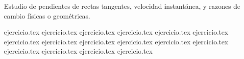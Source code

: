 
Estudio de pendientes de rectas tangentes, velocidad instantánea, y razones de cambio físicas o geométricas.

\begin{enumerate}
    {ejercicio.tex}
    {ejercicio.tex}
    \setcounter{enumi}{2}
    {ejercicio.tex}
    {ejercicio.tex}
    {ejercicio.tex}
    {ejercicio.tex}
    {ejercicio.tex}
    {ejercicio.tex}
    {ejercicio.tex}
    {ejercicio.tex}
    {ejercicio.tex}
    {ejercicio.tex}
    {ejercicio.tex}
    {ejercicio.tex}
    {ejercicio.tex}
    {ejercicio.tex}
\end{enumerate}
